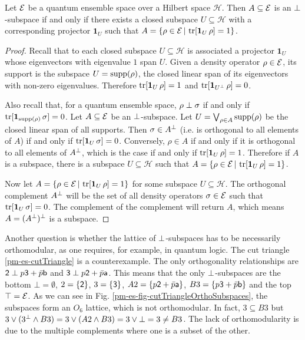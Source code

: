 \begin{mathSection}
	\begin{prop}
		Let $\Ens$ be a quantum ensemble space over a Hilbert space $\mathcal{H}$. Then $A \subseteq \Ens$ is an $\ortho$-subspace if and only if there exists a closed subspace $U \subseteq \mathcal{H}$ with a corresponding projector $\mathbf{1}_{U}$ such that $A = \{ \rho \in \Ens \, | \, \tr[\mathbf{1}_{U} \, \rho] = 1\}$. 
	\end{prop}
	
	\begin{proof}
		Recall that to each closed subspace $U \subseteq \mathcal{H}$ is associated a projector $\mathbf{1}_U$ whose eigenvectors with eigenvalue $1$ span $U$. Given a density operator $\rho \in \Ens$, its support is the subspace $U=\support(\rho)$, the closed linear span of its eigenvectors with non-zero eigenvalues. Therefore $\tr[\mathbf{1}_{U} \, \rho] = 1$ and $\tr[\mathbf{1}_{U^{\ortho}} \, \rho] = 0$.
		
		Also recall that, for a quantum ensemble space, $\rho \ortho \sigma$ if and only if $\tr[ \mathbf{1}_{\support(\rho)} \, \sigma] = 0$. Let $A \subseteq \Ens$ be an $\ortho$-subspace. Let $U = \bigvee_{\rho \in A} \support(\rho)$ be the closed linear span of all supports. Then $\sigma \in A^{\ortho}$  (i.e. is orthogonal to all elements of $A$) if and only if $\tr[\mathbf{1}_{U} \, \sigma] = 0$. Conversely, $\rho \in A$ if and only if it is orthogonal to all elements of $A^{\ortho}$, which is the case if and only if $\tr[\mathbf{1}_{U} \, \rho] = 1$. Therefore if $A$ is a subspace, there is a subspace $U \subseteq \mathcal{H}$ such that $A = \{ \rho \in \Ens \, | \, \tr[\mathbf{1}_{U} \, \rho] = 1\}$.
		
		Now let $A = \{ \rho \in \Ens \, | \, \tr[\mathbf{1}_{U} \, \rho] = 1\}$ for some subspace $U \subseteq \mathcal{H}$. The orthogonal complement $A^{\ortho}$ will be the set of all density operators $\sigma \in \Ens$ such that $\tr[\mathbf{1}_{U} \, \sigma] = 0$. The complement of the complement will return $A$, which means $A = (A^{\ortho})^{\ortho}$ is a subspace.
	\end{proof}
\end{mathSection}

Another question is whether the lattice of $\ortho$-subspaces has to be necessarily orthomodular, as one requires, for example, in quantum logic. The cut triangle \ref{pm-es-cutTriangle} is a counterexample. The only orthogonality relationships are $\ens[2] \ortho p \ens[3] + \bar{p}\ens[b]$ and $\ens[3] \ortho p \ens[2] + \bar{p}\ens[a]$. This means that the only $\ortho$-subspaces are the bottom $\bot = \emptyset$, $2= \{\ens[2]\}$, $3= \{\ens[3]\}$, $A2= \{p \ens[2] + \bar{p}\ens[a]\}$, $B3= \{p \ens[3] + \bar{p}\ens[b]\}$ and the top $\top = \Ens$. As we can see in Fig. \ref{pm-es-fig-cutTriangleOrthoSubspaces}, the subspaces form an $O_6$ lattice, which is not orthomodular. In fact, $3 \subseteq B3$ but $3 \vee (3^{\ortho} \wedge B3) = 3 \vee (A2 \wedge B3) = 3 \vee \bot = 3 \neq B3$. The lack of orthomodularity is due to the multiple complements where one is a subset of the other.

